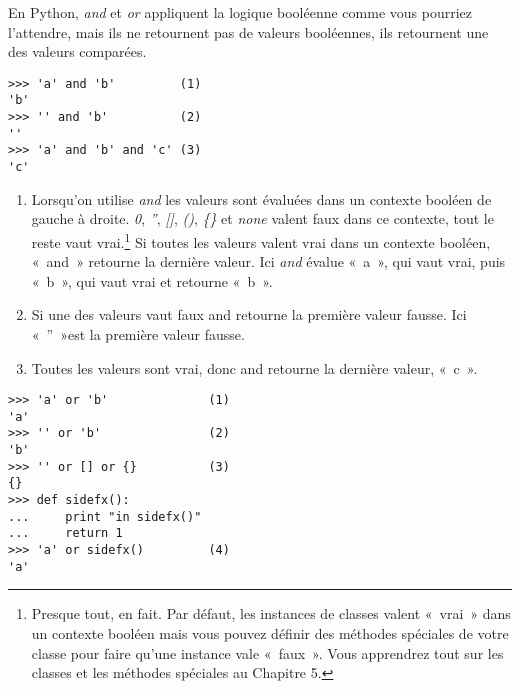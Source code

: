 En Python, \emph{and} et \emph{or} appliquent la logique booléenne comme vous pourriez l’attendre, mais ils ne retournent pas de valeurs booléennes, ils retournent une des valeurs comparées.

\begin{example}
\begin{lstlisting}
>>> 'a' and 'b'         (1)
'b'
>>> '' and 'b'          (2)
''
>>> 'a' and 'b' and 'c' (3)
'c'
\end{lstlisting}
\end{example}

\begin{enumerate}
    \item{Lorsqu’on utilise \emph{and} les valeurs sont évaluées dans un contexte booléen de gauche à droite. \emph{0}, \emph{''}, \emph{[]}, \emph{()}, \emph{\{\}} et \emph{none} valent faux dans ce contexte, tout le reste vaut vrai.\footnote{Presque tout, en fait. Par défaut, les instances de classes valent «~vrai~» dans un contexte booléen mais vous pouvez définir des méthodes spéciales de votre classe pour faire qu’une instance vale «~faux~». Vous apprendrez tout sur les classes et les méthodes spéciales au Chapitre 5.} Si toutes les valeurs valent vrai dans un contexte booléen, «~and~» retourne la dernière valeur. Ici \emph{and} évalue «~a~», qui vaut vrai, puis «~b~», qui vaut vrai et retourne «~b~».}
    \item{Si une des valeurs vaut faux and retourne la première valeur fausse. Ici «~''~»est la première valeur fausse.}
    \item{Toutes les valeurs sont vrai, donc and retourne la dernière valeur, «~c~».}
\end{enumerate}

\begin{example}[Présentation de or]
\begin{lstlisting}
>>> 'a' or 'b'              (1)
'a'
>>> '' or 'b'               (2)
'b'
>>> '' or [] or {}          (3)
{}
>>> def sidefx():
...     print "in sidefx()"
...     return 1
>>> 'a' or sidefx()         (4)
'a'
\end{lstlisting}
\end{example}

